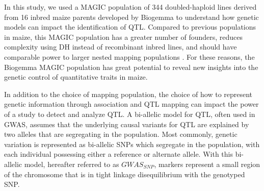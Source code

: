 \documentclass[article,9pt,twocolumn,twoside]{rilabRxiv}
\begin{document}
In this study, we used a MAGIC population of 344 doubled-haploid lines derived from 16 inbred maize parents developed by Biogemma to understand how genetic models can impact the identification of QTL.
Compared to previous populations in maize, this MAGIC population has a greater number of founders, reduces complexity using DH instead of recombinant inbred lines, and should have comparable power to larger nested mapping  populations \citep{DellAcqua,Yu2}.
For these reasons, the Biogemma MAGIC population has great potential to reveal new insights into the genetic control of quantitative traits in maize.

In addition to the choice of mapping population, the choice of how to represent genetic information through association and QTL mapping can impact the power of a study to detect and analyze QTL.
A bi-allelic model for QTL, often used in GWAS, assumes that the underlying causal variants for QTL are explained by two alleles that are segregating in the population.
Most commonly, genetic variation is represented as bi-allelic SNPs which segregate in the population, with each individual possessing either a reference or alternate allele.
With this bi-allelic model, hereafter referred to as $GWAS_{SNP}$, markers represent a small region of the chromosome that is in tight linkage disequilibrium with the genotyped SNP.
\end{document}
